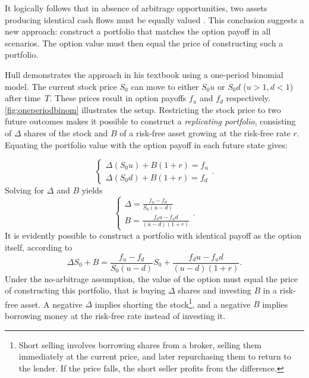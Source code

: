 \documentclass[english,12pt,a4paper,pdftex,sci,utf8]{aaltothesis}
\begin{document}
It logically follows that in absence of arbitrage opportunities, two assets producing identical cash flows must be equally valued \cite{hull2018, wilmott2013paul}. This conclusion suggests a new approach: construct a portfolio that matches the option payoff in all scenarios. The option value must then equal the price of constructing such a portfolio.

Hull \cite{hull2018} demonstrates the approach in his textbook using a one-period binomial model. The current stock price $S_0$ can move to either $S_0u$ or $S_0d$ ($u>1,d<1$) after time~$T$. These prices result in option payoffs $f_u$ and $f_d$ respectively. \cref{fig:oneperiodbinom} illustrates the setup. Restricting the stock price to two future outcomes makes it possible to construct a \emph{replicating portfolio}, consisting of $\Delta$ shares of the stock and $B$ of a risk-free asset growing at the risk-free rate $r$. Equating the portfolio value with the option payoff in each future state gives:

\begin{equation*}
\begin{cases}
    \Delta (S_0u) + B(1+r) = f_u\\
    \Delta (S_0d) + B(1+r) = f_d
\end{cases}.
\end{equation*}
Solving for $\Delta$ and $B$ yields
\begin{equation*}
\begin{cases}
    \Delta = \frac{f_u - f_d}{S_0(u-d)}\\
    B = \frac{f_du-f_ud}{(u-d)(1+r)}
\end{cases}.
\end{equation*}
It is evidently possible to construct a portfolio with identical payoff as the option itself, according to
\begin{equation}
     \Delta S_0 + B=\frac{f_u - f_d}{S_0(u-d)} S_0 + \frac{f_du-f_ud}{(u-d)(1+r)}
\label{eq:replicating-portfolio}.
\end{equation}
Under the no-arbitrage assumption, the value of the option must equal the price of constructing this portfolio, that is buying $\Delta$ shares and investing $B$ in a risk-free asset. A negative $\Delta$ implies shorting the stock\footnote{Short selling involves borrowing shares from a broker, selling them immediately at the current price, and later repurchasing them to return to the lender. If the price falls, the short seller profits from the difference.}, and a negative $B$ implies borrowing money at the risk-free rate instead of investing it.
\end{document}
